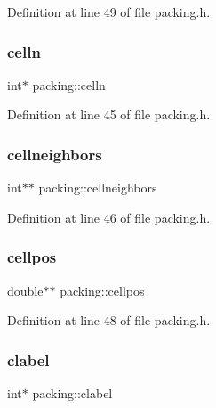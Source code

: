 Definition at line 49 of file packing.\+h.

\mbox{\label{classpacking_ae917ff801cb46aad3cb68a44acce4020}} 
\subsubsection{\texorpdfstring{celln}{celln}}
{\footnotesize\ttfamily int$\ast$ packing\+::celln\hspace{0.3cm}{\ttfamily [protected]}}



Definition at line 45 of file packing.\+h.

\mbox{\label{classpacking_a644c3ce4ed2caba0c84f30af9f7d58a8}} 
\subsubsection{\texorpdfstring{cellneighbors}{cellneighbors}}
{\footnotesize\ttfamily int$\ast$$\ast$ packing\+::cellneighbors\hspace{0.3cm}{\ttfamily [protected]}}



Definition at line 46 of file packing.\+h.

\mbox{\label{classpacking_a4b3af5f349b64a433c53382610fb6563}} 
\subsubsection{\texorpdfstring{cellpos}{cellpos}}
{\footnotesize\ttfamily double$\ast$$\ast$ packing\+::cellpos\hspace{0.3cm}{\ttfamily [protected]}}



Definition at line 48 of file packing.\+h.

\mbox{\label{classpacking_a3610364abb17fe2c0bacec06e05d9123}} 
\subsubsection{\texorpdfstring{clabel}{clabel}}
{\footnotesize\ttfamily int$\ast$ packing\+::clabel\hspace{0.3cm}{\ttfamily [protected]}}



